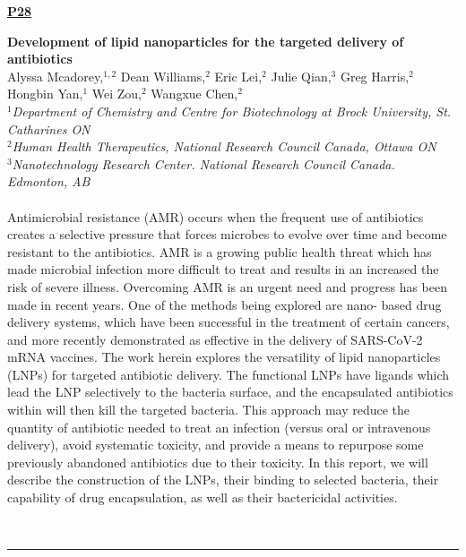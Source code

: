 \documentclass[titlepage,oneside,openany,10pt]{book}
\newenvironment{posterabs}[4] %
        {
	\begin{flushright}
                \underline{\textbf{#4}}
        \end{flushright}
        \textbf{#1}\\%
        #2\\%
        \textit{#3}\\\\%
        }
        {
        \\
        \noindent\rule{15cm}{0.5pt}%
        }
\begin{document}


\begin{posterabs}
	{Development of lipid nanoparticles for the targeted delivery of antibiotics}
	{Alyssa Mcadorey,$^{1,2}$ Dean Williams,$^{2}$ Eric Lei,$^{2}$ Julie Qian,$^{3}$ Greg Harris,$^{2}$ Hongbin Yan,$^{1}$ Wei Zou,$^{2}$ Wangxue Chen,$^{2}$}
	{
	$^1$Department of Chemistry and Centre for Biotechnology at Brock University, St. Catharines ON\\
	$^2$Human Health Therapeutics, National Research Council Canada, Ottawa ON\\
	$^3$Nanotechnology Research Center. National Research Council Canada. Edmonton, AB
	}
	{P28}
	Antimicrobial resistance (AMR) occurs when the frequent use of antibiotics creates a selective pressure that forces microbes to evolve over time and become resistant to the antibiotics. AMR is a growing public health threat which has made microbial infection more difficult to treat and results in an increased the risk of severe illness. Overcoming AMR is an urgent need and progress has been made in recent years. One of the methods being explored are nano- based drug delivery systems, which have been successful in the treatment of certain cancers, and more recently demonstrated as effective in the delivery of SARS-CoV-2 mRNA vaccines. The work herein explores the versatility of lipid nanoparticles (LNPs) for targeted antibiotic delivery. The functional LNPs have ligands which lead the LNP selectively to the bacteria surface, and the encapsulated antibiotics within will then kill the targeted bacteria. This approach may reduce the quantity of antibiotic needed to treat an infection (versus oral or intravenous delivery), avoid systematic toxicity, and provide a means to repurpose some previously abandoned antibiotics due to their toxicity. In this report, we will describe the construction of the LNPs, their binding to selected bacteria, their capability of drug encapsulation, as well as their bactericidal activities.
	\label{McadoreyA}
\end{posterabs}

\newpage
\end{document}
